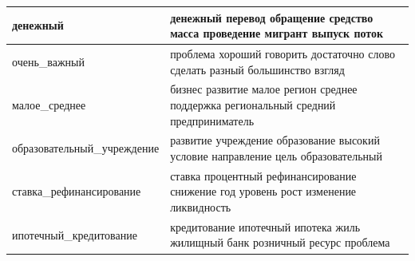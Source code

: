 \documentclass[a4paper, 14pt]{extarticle}
\begin{document}
\begin{landscape}
\begin{small}
\begin{singlespace}
\begin{table}[h]
\begin{tabular}{|l|l|}
					денежный &  денежный перевод обращение средство масса проведение мигрант выпуск поток \\ \hline
					очень\_важный &  проблема хороший говорить достаточно слово сделать разный большинство взгляд \\ \hline
					малое\_среднее &  бизнес развитие малое регион среднее поддержка региональный средний предприниматель \\ \hline
					образовательный\_учреждение &  развитие учреждение образование высокий условие  направление цель образовательный \\ \hline
					ставка\_рефинансирование &  ставка процентный рефинансирование снижение год уровень рост изменение ликвидность \\ \hline
					ипотечный\_кредитование &  кредитование ипотечный ипотека жиль жилищный банк розничный ресурс проблема \\ \hline
				\end{tabular}
			\end{table}
		\end{singlespace}
	\end{small}
\end{landscape}
\restoregeometry
\end{document}
